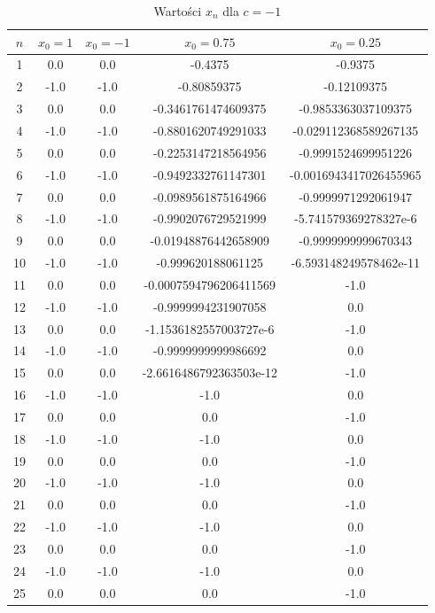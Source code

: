 \documentclass[10pt,a4paper, polish]{article}
\begin{document}
\begin{table}[H]
\centering
\caption{Wartości $x_n$ dla $c = -1$}
\begin{tabular}{|c|c|c|c|c|}
\hline
$n$ & $x_0=1$ & $x_0=-1$ & $x_0=0.75$ & $x_0=0.25$ \\
\hline
1 & 0.0 & 0.0 & -0.4375 & -0.9375 \\
\hline
2 & -1.0 & -1.0 & -0.80859375 & -0.12109375 \\
\hline
3 & 0.0 & 0.0 & -0.3461761474609375 & -0.9853363037109375 \\
\hline
4 & -1.0 & -1.0 & -0.8801620749291033 & -0.029112368589267135 \\
\hline
5 & 0.0 & 0.0 & -0.2253147218564956 & -0.9991524699951226 \\
\hline
6 & -1.0 & -1.0 & -0.9492332761147301 & -0.0016943417026455965 \\
\hline
7 & 0.0 & 0.0 & -0.0989561875164966 & -0.9999971292061947 \\
\hline
8 & -1.0 & -1.0 & -0.9902076729521999 & -5.741579369278327e-6 \\
\hline
9 & 0.0 & 0.0 & -0.01948876442658909 & -0.9999999999670343 \\
\hline
10 & -1.0 & -1.0 & -0.999620188061125 & -6.593148249578462e-11 \\
\hline
11 & 0.0 & 0.0 & -0.0007594796206411569 & -1.0 \\
\hline
12 & -1.0 & -1.0 & -0.9999994231907058 & 0.0 \\
\hline
13 & 0.0 & 0.0 & -1.1536182557003727e-6 & -1.0 \\
\hline
14 & -1.0 & -1.0 & -0.9999999999986692 & 0.0 \\
\hline
15 & 0.0 & 0.0 & -2.6616486792363503e-12 & -1.0 \\
\hline
16 & -1.0 & -1.0 & -1.0 & 0.0 \\
\hline
17 & 0.0 & 0.0 & 0.0 & -1.0 \\
\hline
18 & -1.0 & -1.0 & -1.0 & 0.0 \\
\hline
19 & 0.0 & 0.0 & 0.0 & -1.0 \\
\hline
20 & -1.0 & -1.0 & -1.0 & 0.0 \\
\hline
21 & 0.0 & 0.0 & 0.0 & -1.0 \\
\hline
22 & -1.0 & -1.0 & -1.0 & 0.0 \\
\hline
23 & 0.0 & 0.0 & 0.0 & -1.0 \\
\hline
24 & -1.0 & -1.0 & -1.0 & 0.0 \\
\hline
25 & 0.0 & 0.0 & 0.0 & -1.0 \\

\end{tabular}
\end{table}
\end{document}
